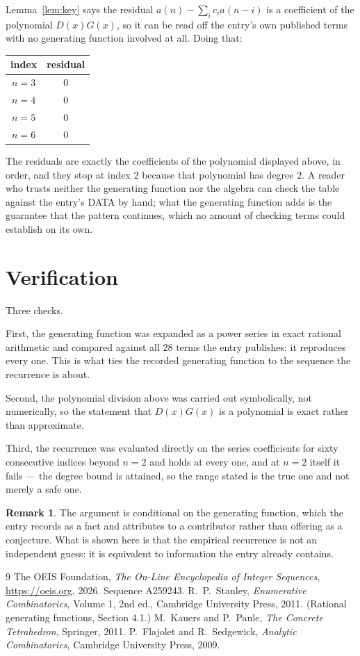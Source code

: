 \documentclass[11pt,a4paper]{article}
\theoremstyle{plain}
\theoremstyle{definition}
\newtheorem{remark}[theorem]{Remark}
\begin{document}
Lemma~\ref{lem:key} says the residual $a(n)-\sum_ic_ia(n-i)$ is a coefficient of the
polynomial $D(x)G(x)$, so it can be read off the entry's own published terms with no
generating function involved at all. Doing that:
\begin{center}
\begin{tabular}{cc}
index & residual \\ \hline
$n=3$ & $0$ \\
$n=4$ & $0$ \\
$n=5$ & $0$ \\
$n=6$ & $0$
\end{tabular}
\end{center}
The residuals are exactly the coefficients of the polynomial displayed above, in order, and
they stop at index $2$ because that polynomial has degree $2$. A reader who trusts
neither the generating function nor the algebra can check the table against the entry's DATA
by hand; what the generating function adds is the guarantee that the pattern continues, which
no amount of checking terms could establish on its own.

\section{Verification}

Three checks.

First, the generating function was expanded as a power series in exact rational arithmetic and
compared against all $28$ terms the entry publishes: it reproduces every one. This is
what ties the recorded generating function to the sequence the recurrence is about.

Second, the polynomial division above was carried out symbolically, not numerically, so the
statement that $D(x)G(x)$ is a polynomial is exact rather than approximate.

Third, the recurrence was evaluated directly on the series coefficients for sixty consecutive
indices beyond $n=2$ and holds at every one, and at $n=2$ itself it fails --- the
degree bound is attained, so the range stated is the true one and not merely a safe one.

\begin{remark}
The argument is conditional on the generating function, which the entry records as a fact and
attributes to a contributor rather than offering as a conjecture. What is shown here is that
the empirical recurrence is not an independent guess: it is equivalent to information the
entry already contains.
\end{remark}

\begin{thebibliography}{9}
 The OEIS Foundation, \emph{The On-Line Encyclopedia of Integer
Sequences}, \url{https://oeis.org}, 2026. Sequence A259243.
 R.~P.~Stanley, \emph{Enumerative Combinatorics}, Volume 1, 2nd ed.,
Cambridge University Press, 2011. (Rational generating functions, Section 4.1.)
 M.~Kauers and P.~Paule, \emph{The Concrete Tetrahedron}, Springer, 2011.
 P.~Flajolet and R.~Sedgewick, \emph{Analytic Combinatorics}, Cambridge
University Press, 2009.
\end{thebibliography}
\end{document}
